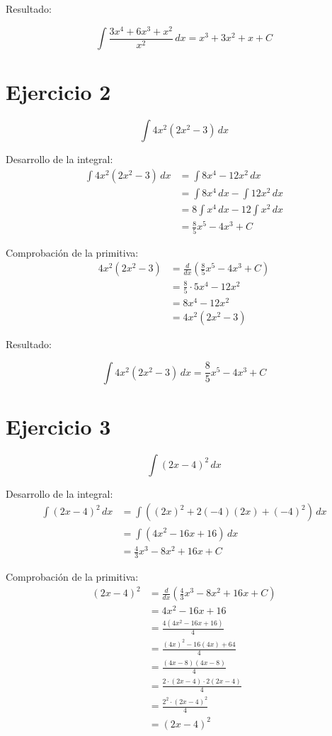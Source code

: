 \documentclass[12pt]{article}
\begin{document}
Resultado:

\[ \int \frac{3x^{4} + 6x^{3} + x^{2}}{x^{2}} \, dx = x^{3} + 3x^{2} + x + C \]
\newpage

\section*{Ejercicio 2}

\[ \int 4x^{2} \left( 2x^{2} - 3 \right) \, dx \]

Desarrollo de la integral:
\begin{align*}
	\int 4x^{2} \left( 2x^{2} - 3 \right) \, dx &= \int 8x^{4} - 12x^{2} \, dx \\
	&= \int 8x^{4} \, dx - \int 12x^{2} \, dx \\
	&= 8 \int x^{4} \, dx - 12 \int x^{2} \, dx \\
	&= \frac{8}{5} x^{5} - 4x^{3} + C
\end{align*}

Comprobación de la primitiva:
\begin{align*}
	4x^{2} \left( 2x^{2} - 3 \right) &= \frac{d}{dx} \left( \frac{8}{5} x^{5} - 4x^{3} + C \right) \\
	&= \frac{8}{5} \cdot 5x^{4} - 12x^{2} \\
	&= 8x^{4} - 12x^{2} \\
	&= 4x^{2} \left( 2x^{2} - 3 \right) 
\end{align*}

Resultado:

\[ \int 4x^{2} \left( 2x^{2} - 3 \right) \, dx = \frac{8}{5} x^{5} - 4x^{3} + C \]
\newpage

\section*{Ejercicio 3}

\[ \int (2x - 4)^{2} \, dx\]

Desarrollo de la integral:
\begin{align*}
	\int (2x - 4)^{2} \, dx &= \int \left( (2x)^{2} + 2(-4)(2x) + (-4)^{2} \right) \, dx \\
	&= \int \left( 4x^{2} - 16x + 16 \right) \, dx \\
	&= \frac{4}{3} x^{3} - 8x^{2} + 16x + C
\end{align*}

Comprobación de la primitiva:
\begin{align*}
	(2x - 4)^{2} &= \frac{d}{dx} \left( \frac{4}{3} x^{3} - 8x^{2} + 16x + C \right) \\
	&= 4x^{2} - 16x + 16 \\
	&= \frac{4 \left( 4x^{2} - 16x + 16 \right) }{4} \\
	&= \frac{(4x)^{2} -16(4x) + 64}{4} \\
	&= \frac{(4x - 8) (4x - 8)}{4} \\
	&= \frac{2 \cdot (2x - 4) \cdot 2 (2x - 4)}{4} \\
	&= \frac{2^{2} \cdot (2x - 4)^{2}}{4} \\
	&= (2x - 4)^{2}
\end{align*}
\end{document}
